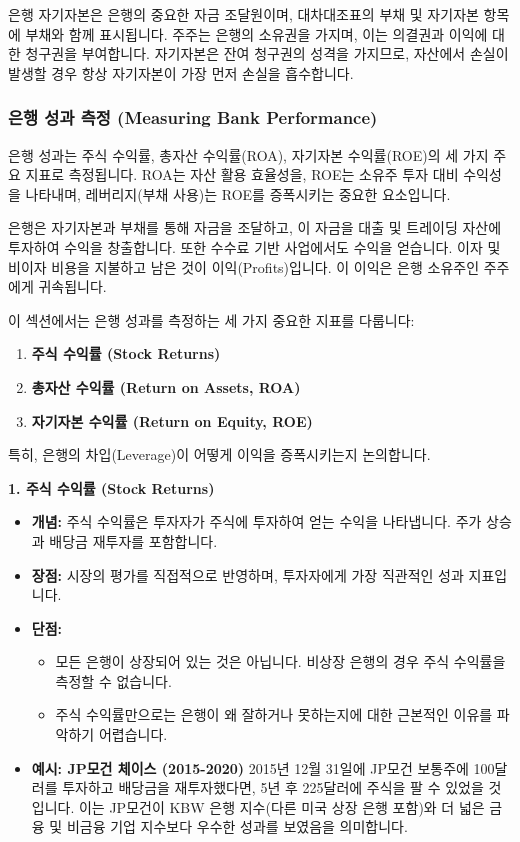 \documentclass[11pt,a4paper]{book}
\theoremstyle{definition}
\begin{document}
\begin{summarybox}[title=\textbf{자기자본 요약}]
은행 자기자본은 은행의 중요한 자금 조달원이며, 대차대조표의 부채 및 자기자본 항목에 부채와 함께 표시됩니다. 주주는 은행의 소유권을 가지며, 이는 의결권과 이익에 대한 청구권을 부여합니다. 자기자본은 잔여 청구권의 성격을 가지므로, 자산에서 손실이 발생할 경우 항상 자기자본이 가장 먼저 손실을 흡수합니다.
\end{summarybox}


\subsubsection{은행 성과 측정 (Measuring Bank Performance)}

\begin{infobox}[title=\textbf{핵심 요약: 은행 성과 측정}]
은행 성과는 주식 수익률, 총자산 수익률(ROA), 자기자본 수익률(ROE)의 세 가지 주요 지표로 측정됩니다. ROA는 자산 활용 효율성을, ROE는 소유주 투자 대비 수익성을 나타내며, 레버리지(부채 사용)는 ROE를 증폭시키는 중요한 요소입니다.
\end{infobox}

은행은 자기자본과 부채를 통해 자금을 조달하고, 이 자금을 대출 및 트레이딩 자산에 투자하여 수익을 창출합니다. 또한 수수료 기반 사업에서도 수익을 얻습니다. 이자 및 비이자 비용을 지불하고 남은 것이 이익(Profits)입니다. 이 이익은 은행 소유주인 주주에게 귀속됩니다.

이 섹션에서는 은행 성과를 측정하는 세 가지 중요한 지표를 다룹니다:
\begin{enumerate}
    \item \textbf{주식 수익률 (Stock Returns)}
    \item \textbf{총자산 수익률 (Return on Assets, ROA)}
    \item \textbf{자기자본 수익률 (Return on Equity, ROE)}
\end{enumerate}
특히, 은행의 차입(Leverage)이 어떻게 이익을 증폭시키는지 논의합니다.

\textbf{1. 주식 수익률 (Stock Returns)}
\begin{itemize}
    \item \textbf{개념:} 주식 수익률은 투자자가 주식에 투자하여 얻는 수익을 나타냅니다. 주가 상승과 배당금 재투자를 포함합니다.
    \item \textbf{장점:} 시장의 평가를 직접적으로 반영하며, 투자자에게 가장 직관적인 성과 지표입니다.
    \item \textbf{단점:}
        \begin{itemize}
            \item 모든 은행이 상장되어 있는 것은 아닙니다. 비상장 은행의 경우 주식 수익률을 측정할 수 없습니다.
            \item 주식 수익률만으로는 은행이 왜 잘하거나 못하는지에 대한 근본적인 이유를 파악하기 어렵습니다.
        \end{itemize}
    \item \textbf{예시: JP모건 체이스 (2015-2020)}
        2015년 12월 31일에 JP모건 보통주에 100달러를 투자하고 배당금을 재투자했다면, 5년 후 225달러에 주식을 팔 수 있었을 것입니다. 이는 JP모건이 KBW 은행 지수(다른 미국 상장 은행 포함)와 더 넓은 금융 및 비금융 기업 지수보다 우수한 성과를 보였음을 의미합니다.
\end{itemize}
\end{document}
